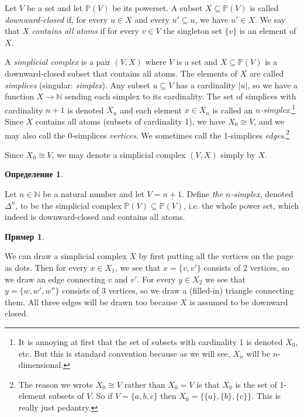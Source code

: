 \documentclass[a4paper]{book}
\def\PP{{\mathbb P}}
\def\NN{{\mathbb N}}
\def\to{\rightarrow}
\def\ss{\subseteq}
\def\iso{\cong}
\def\ul{\underline}
\theoremstyle{myth}
\newtheorem{exampleENG}[envENG]{\begin{english}Example\end{english}}
\newtheorem{definitionENG}[envENG]{\begin{english}Definition\end{english}}
\newtheorem{exampleRUS}[envRUS]{Пример}
\newtheorem{definitionRUS}[envRUS]{Определение}
\begin{document}
\begin{russian}
\begin{definitionENG}\label{def:simplicial complex}
Let $V$ be a set and let $\PP(V)$ be its powerset. A subset $X\ss\PP(V)$ is called {\em downward-closed} if, for every $u\in X$ and every $u'\ss u$, we have $u'\in X$. We say that $X$ {\em contains all atoms} if for every $v\in V$ the singleton set $\{v\}$ is an element of $X$. 

A {\em simplicial complex} is a pair $(V,X)$ where $V$ is a set and $X\ss\PP(V)$ is a downward-closed subset that contains all atoms. The elements of $X$ are called {\em simplices} (singular: {\em simplex}). Any subset $u\ss V$ has a cardinality $|u|$, so we have a function $X\to\NN$ sending each simplex to its cardinality. The set of simplices with cardinality $n+1$ is denoted $X_n$ and each element $x\in X_n$ is called an {\em $n$-simplex}.\footnote{It is annoying at first that the set of subsets with cardinality 1 is denoted $X_0$, etc. But this is standard convention because as we will see, $X_n$ will be $n$-dimensional.}
Since $X$ contains all atoms (subsets of cardinality 1), we have $X_0\iso V$, and we may also call the 0-simplices {\em vertices}. We sometimes call the 1-simplices {\em edges}.\footnote{The reason we wrote $X_0\iso V$ rather than $X_0=V$ is that $X_0$ is the set of 1-element subsets of $V$. So if $V=\{a,b,c\}$ then $X_0=\{\{a\},\{b\},\{c\}\}$. This is really just pedantry.}

Since $X_0\iso V$, we may denote a simplicial complex $(V,X)$ simply by $X$.
\end{definitionENG}

\begin{definitionRUS}\label{def:simplicial complex}
 
\end{definitionRUS}

\begin{exampleENG}
Let $n\in\NN$ be a natural number and let $V=\ul{n+1}$. Define {\em the $n$-simplex}, denoted $\Delta^n$, to be the simplicial complex $\PP(V)\ss\PP(V)$, i.e. the whole power set, which indeed is downward-closed and contains all atoms. 
\end{exampleENG}

\begin{exampleRUS}
 
\end{exampleRUS}

We can draw a simplicial complex $X$ by first putting all the vertices on the page as dots. Then for every $x\in X_1$, we see that $x=\{v,v'\}$ consists of 2 vertices, so we draw an edge connecting $v$ and $v'$. For every $y\in X_2$ we see that $y=\{w,w',w''\}$ consists of 3 vertices, so we draw a (filled-in) triangle connecting them. All three edges will be drawn too because $X$ is assumed to be downward closed.


\end{russian}
\end{document}
